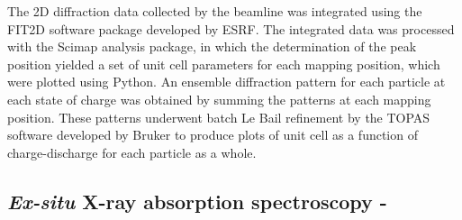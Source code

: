 \documentclass{article}
\begin{document}
The 2D diffraction data collected by the beamline was integrated using
the FIT2D software package developed by
ESRF\cite{hausermann1996,hammersley1997}. The integrated data was
processed with the Scimap analysis package\cite{scimap}, in which the
determination of the peak position yielded a set of unit cell
parameters for each mapping position, which were plotted using
Python. An ensemble diffraction pattern for each particle at each
state of charge was obtained by summing the patterns at each mapping
position. These patterns underwent batch Le Bail refinement by the
TOPAS software developed by Bruker to produce plots of unit cell as a
function of charge-discharge for each particle as a whole.

\subsection{\textit{Ex-situ} X-ray absorption spectroscopy - \nca{}}
\end{document}
